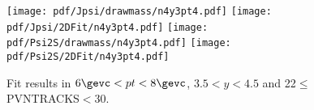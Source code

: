 \begin{figure}[H]
\begin{center}
\texttt{[image: pdf/Jpsi/drawmass/n4y3pt4.pdf]}
\texttt{[image: pdf/Jpsi/2DFit/n4y3pt4.pdf]}
\vspace*{-0.5cm}
\texttt{[image: pdf/Psi2S/drawmass/n4y3pt4.pdf]}
\texttt{[image: pdf/Psi2S/2DFit/n4y3pt4.pdf]}
\vspace*{-0.5cm}
\end{center}
\caption{Fit results in $6\gevc<pt<8\gevc$, $3.5<y<4.5$ and 22$\leq$PVNTRACKS$<$30.}
\label{Fitn4y3pt4}
\end{figure}
